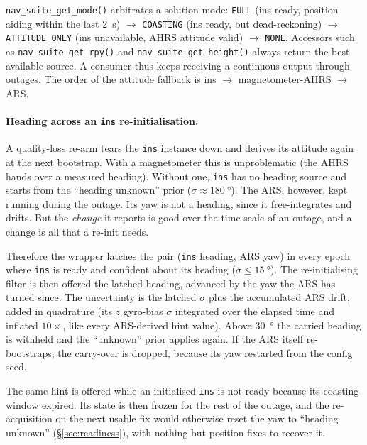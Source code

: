 \documentclass[11pt,a4paper]{article}
\newcommand{\code}[1]{\texttt{#1}}
\begin{document}
\code{nav\_\allowbreak{}suite\_\allowbreak{}get\_\allowbreak{}mode()}
arbitrates a solution mode: \code{FULL} (ins ready, position aiding within the
last \SI{2}{\second}) $\rightarrow$ \code{COASTING} (ins ready, but
dead-reckoning) $\rightarrow$ \code{ATTITUDE\_\allowbreak{}ONLY} (ins
unavailable, AHRS attitude valid) $\rightarrow$ \code{NONE}. Accessors such as
\code{nav\_\allowbreak{}suite\_\allowbreak{}get\_\allowbreak{}rpy()} and
\code{nav\_\allowbreak{}suite\_\allowbreak{}get\_\allowbreak{}height()} always
return the best available source. A consumer thus keeps receiving a continuous
output through outages. The order of the attitude fallback is ins
$\rightarrow$ magnetometer-AHRS $\rightarrow$ ARS.

\paragraph{Heading across an \code{ins} re-initialisation.} A quality-loss
re-arm tears the \code{ins} instance down and derives its attitude again at the
next bootstrap. With a magnetometer this is unproblematic (the AHRS hands over a
measured heading). Without one, \code{ins} has no heading source and starts from
the ``heading unknown'' prior ($\sigma \approx \SI{180}{\degree}$). The ARS,
however, kept running during the outage. Its yaw is not a heading, since it
free-integrates and drifts. But the \emph{change} it reports is good over the
time scale of an outage, and a change is all that a re-init needs.

Therefore the wrapper latches the pair (\code{ins} heading, ARS yaw) in every
epoch where \code{ins} is ready and confident about its heading
($\sigma \le \SI{15}{\degree}$). The re-initialising filter is then offered the
latched heading, advanced by the yaw the ARS has turned since. The uncertainty
is the latched $\sigma$ plus the accumulated ARS drift, added in quadrature (its
$z$ gyro-bias $\sigma$ integrated over the elapsed time and inflated $10\times$,
like every ARS-derived hint value). Above \SI{30}{\degree} the carried heading
is withheld and the ``unknown'' prior applies again. If the ARS itself
re-bootstraps, the carry-over is dropped, because its yaw restarted from the
config seed.

The same hint is offered while an initialised \code{ins} is not ready because
its coasting window expired. Its state is then frozen for the rest of the
outage, and the re-acquisition on the next usable fix would otherwise reset
the yaw to ``heading unknown'' (\S\ref{sec:readiness}), with nothing but position
fixes to recover it.
\end{document}
